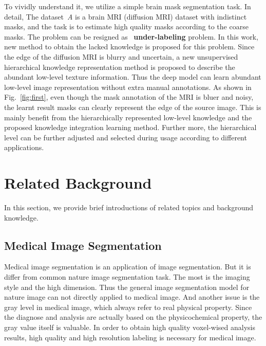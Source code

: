 \documentclass[10pt,twocolumn,letterpaper]{article}
\begin{document}
To vividly understand it, we utilize a simple brain mask segmentation task. 
In detail, The dataset~\textit{A} is a brain MRI (diffusion MRI) dataset with indistinct masks, and the task is to estimate high quality masks according to the coarse masks.
The problem can be resigned as ~\textbf{under-labeling} problem. 
In this work, new method to obtain the lacked knowledge is proposed for this problem. 
Since the edge of the diffusion MRI is blurry and uncertain, a new unsupervised hierarchical knowledge representation method is proposed to describe the abundant low-level texture information. Thus the deep model can learn abundant low-level image representation without extra manual annotations. 
As shown in Fig.~\cref{fig:first}, even though the mask annotation of the MRI is bluer and noisy, the learnt result masks can clearly represent the edge of the source image. 
This is mainly benefit from the hierarchically represented low-level knowledge and the proposed knowledge integration learning method. 
Further more, the hierarchical level can be further adjusted and selected during usage according to different applications. 




\section{Related Background}

In this section, we provide brief introductions of related topics and background knowledge. 

\subsection{Medical Image Segmentation}
Medical image segmentation is an application of image segmentation. 
But it is differ from common nature image segmentation task. 
The most is the imaging style and the high dimension. Thus the general image segmentation model for nature image can not directly applied to medical image. 
And another issue is the gray level in medical image, which always refer to real physical property. 
Since the diagnose and analysis are actually based on the physicochemical property, the gray value itself is valuable. 
In order to obtain high quality voxel-wised analysis results, high quality and high resolution labeling is necessary for medical image. 
\end{document}
